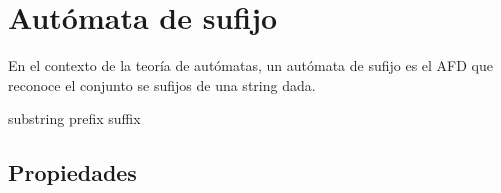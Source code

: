 \section{Autómata de sufijo}\label{SuffixAutomaton}
En el contexto de la teoría de autómatas, un autómata de sufijo es el \acrshort{AFD} que reconoce el conjunto se sufijos de una \gls{string} dada.

\gls{substring}
\gls{prefix}
\gls{suffix}

\subsection{Propiedades}


